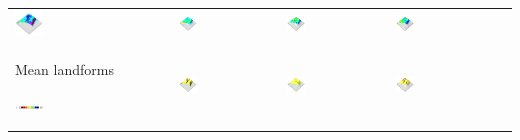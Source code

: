 \documentclass[prodmode,acmtochi]{acmsmall} %
\begin{document}
\begin{table}
{\begin{tabular}{m{} m{} m{} m{} m{}}
\includegraphics[width=0.19\textwidth]{images/render_3d/participants/slope_1.png} &
\includegraphics[width=0.19\textwidth]{images/render_3d/participants/mean_slope_1.png} &
\includegraphics[width=0.19\textwidth]{images/render_3d/participants/mean_slope_2.png} &
\includegraphics[width=0.19\textwidth]{images/render_3d/participants/mean_slope_3.png}\\
%
Mean landforms \par \vspace{0.5em} \includegraphics[width=0.19\textwidth]{images/legends/forms_legend.pdf} & 
\includegraphics[width=0.19\textwidth]{images/render_3d/participants/forms_1.png} &
\includegraphics[width=0.19\textwidth]{images/render_3d/participants/mean_forms_1.png} &
\includegraphics[width=0.19\textwidth]{images/render_3d/participants/mean_forms_2.png} &

\end{tabular}}
\end{table}
\end{document}
